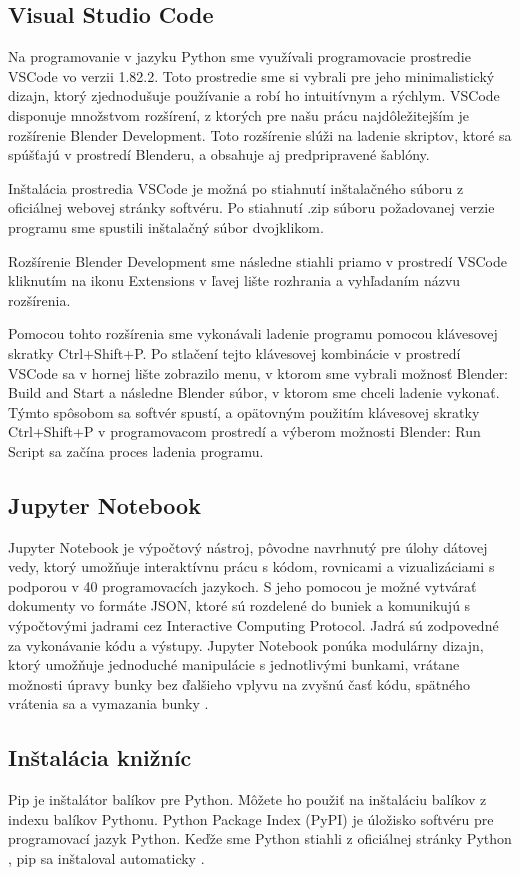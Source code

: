 \subsection{Visual Studio Code}
Na programovanie v jazyku Python sme využívali programovacie prostredie VSCode vo verzii 1.82.2. Toto prostredie sme si vybrali pre jeho minimalistický dizajn, ktorý zjednodušuje používanie a robí ho intuitívnym a rýchlym. VSCode disponuje množstvom rozšírení, z ktorých pre našu prácu najdôležitejším je rozšírenie Blender Development. Toto rozšírenie slúži na ladenie skriptov, ktoré sa spúšťajú v prostredí Blenderu, a obsahuje aj predpripravené šablóny.

Inštalácia prostredia VSCode je možná po stiahnutí inštalačného súboru z oficiálnej webovej stránky softvéru. Po stiahnutí .zip súboru požadovanej verzie programu sme spustili inštalačný súbor dvojklikom.

Rozšírenie Blender Development sme následne stiahli priamo v prostredí VSCode kliknutím na ikonu Extensions v ľavej lište rozhrania a vyhľadaním názvu rozšírenia.

Pomocou tohto rozšírenia sme vykonávali ladenie programu pomocou klávesovej skratky Ctrl+Shift+P. Po stlačení tejto klávesovej kombinácie v prostredí VSCode sa v hornej lište zobrazilo menu, v ktorom sme vybrali možnosť Blender: Build and Start a následne Blender súbor, v ktorom sme chceli ladenie vykonať. Týmto spôsobom sa softvér spustí, a opätovným použitím klávesovej skratky Ctrl+Shift+P v programovacom prostredí a výberom možnosti Blender: Run Script sa začína proces ladenia programu.

\subsection{Jupyter Notebook}
Jupyter Notebook je výpočtový nástroj, pôvodne navrhnutý pre úlohy dátovej vedy, ktorý umožňuje interaktívnu prácu s kódom, rovnicami a vizualizáciami s podporou v 40 programovacích jazykoch. S jeho pomocou je možné vytvárať dokumenty vo formáte JSON, ktoré sú rozdelené do buniek a komunikujú s výpočtovými jadrami cez Interactive Computing Protocol. Jadrá sú zodpovedné za vykonávanie kódu a výstupy. Jupyter Notebook ponúka modulárny dizajn, ktorý umožňuje jednoduché manipulácie s jednotlivými bunkami, vrátane možnosti úpravy bunky bez ďalšieho vplyvu na zvyšnú časť kódu, spätného vrátenia sa a vymazania bunky \cite{Jupyter}.

\subsection{Inštalácia knižníc}
Pip je inštalátor balíkov pre Python. Môžete ho použiť na inštaláciu balíkov z indexu balíkov Pythonu. Python Package Index (PyPI) je úložisko softvéru pre programovací jazyk Python. Keďže sme Python stiahli z oficiálnej stránky Python \cite{PythonDownload}, pip sa inštaloval automaticky \cite{Pip}. 

